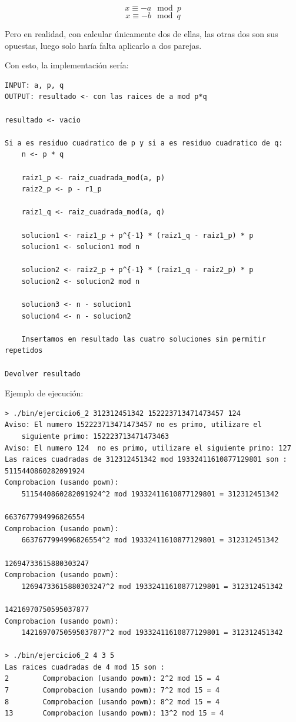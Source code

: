 \documentclass[12pt, spanish]{article}
\begin{document}
$$x \equiv -a \mod p$$
$$x \equiv -b \mod q$$

Pero en realidad, con calcular únicamente dos de ellas, las otras dos son sus opuestas, luego solo haría falta aplicarlo a dos parejas.

Con esto, la implementación sería:


\begin{lstlisting}[caption={Algoritmo raices cuadradas mod p*q}]
INPUT: a, p, q
OUTPUT: resultado <- con las raices de a mod p*q

resultado <- vacio

Si a es residuo cuadratico de p y si a es residuo cuadratico de q:
	n <- p * q

	raiz1_p <- raiz_cuadrada_mod(a, p)
	raiz2_p <- p - r1_p

	raiz1_q <- raiz_cuadrada_mod(a, q)

	solucion1 <- raiz1_p + p^{-1} * (raiz1_q - raiz1_p) * p
	solucion1 <- solucion1 mod n

	solucion2 <- raiz2_p + p^{-1} * (raiz1_q - raiz2_p) * p
	solucion2 <- solucion2 mod n

	solucion3 <- n - solucion1
	solucion4 <- n - solucion2

	Insertamos en resultado las cuatro soluciones sin permitir repetidos

Devolver resultado
\end{lstlisting}

Ejemplo de ejecución:

\begin{lstlisting}
> ./bin/ejercicio6_2 312312451342 152223713471473457 124
Aviso: El numero 152223713471473457 no es primo, utilizare el
	siguiente primo: 152223713471473463
Aviso: El numero 124  no es primo, utilizare el siguiente primo: 127
Las raices cuadradas de 312312451342 mod 19332411610877129801 son :
5115440860282091924
Comprobacion (usando powm):
	5115440860282091924^2 mod 19332411610877129801 = 312312451342

6637677994996826554
Comprobacion (usando powm):
	6637677994996826554^2 mod 19332411610877129801 = 312312451342

12694733615880303247
Comprobacion (usando powm):
	12694733615880303247^2 mod 19332411610877129801 = 312312451342

14216970750595037877
Comprobacion (usando powm):
	14216970750595037877^2 mod 19332411610877129801 = 312312451342

> ./bin/ejercicio6_2 4 3 5
Las raices cuadradas de 4 mod 15 son :
2        Comprobacion (usando powm): 2^2 mod 15 = 4
7        Comprobacion (usando powm): 7^2 mod 15 = 4
8        Comprobacion (usando powm): 8^2 mod 15 = 4
13       Comprobacion (usando powm): 13^2 mod 15 = 4
\end{lstlisting}
\end{document}
